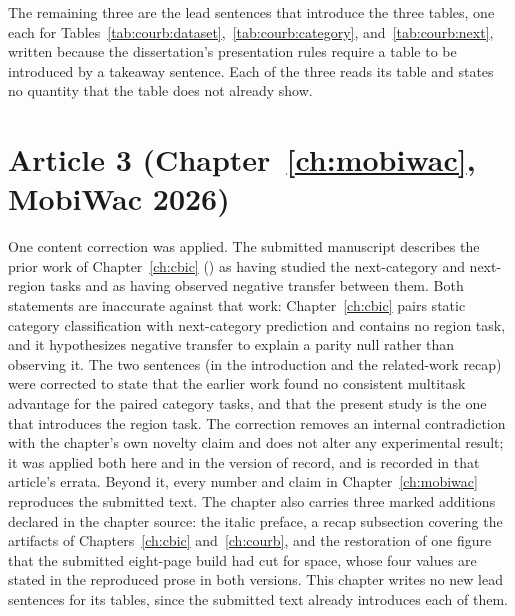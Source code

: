 The remaining three are the lead sentences that introduce the three tables,
one each for Tables~\ref{tab:courb:dataset},~\ref{tab:courb:category},
and~\ref{tab:courb:next}, written because the dissertation's presentation rules require a
table to be introduced by a takeaway sentence. Each of the three reads its table and states
no quantity that the table does not already show.

\section{Article 3 (Chapter~\ref{ch:mobiwac}, MobiWac 2026)}
\label{apx:errata:mobiwac}

One content correction was applied. The submitted manuscript describes the prior work
of Chapter~\ref{ch:cbic} (\cite{silva2025mtlnet}) as having studied the next-category
and next-region tasks and as having observed negative transfer between them. Both
statements are inaccurate against that work: Chapter~\ref{ch:cbic} pairs static category
classification with next-category prediction and contains no region task, and it
hypothesizes negative transfer to explain a parity null rather than observing it. The
two sentences (in the introduction and the related-work recap) were corrected to state
that the earlier work found no consistent multitask advantage for the paired category
tasks, and that the present study is the one that introduces the region task. The
correction removes an internal contradiction with the chapter's own novelty claim and
does not alter any experimental result; it was applied both here and in the version of
record, and is recorded in that article's errata. Beyond it, every number and claim in
Chapter~\ref{ch:mobiwac} reproduces the submitted text. The chapter also carries three
marked additions declared in the chapter source: the italic preface, a recap subsection
covering the artifacts of Chapters~\ref{ch:cbic} and~\ref{ch:courb}, and the restoration
of one figure that the submitted eight-page build had cut for space, whose four values
are stated in the reproduced prose in both versions. This chapter writes no new lead
sentences for its tables, since the submitted text already introduces each of them.

